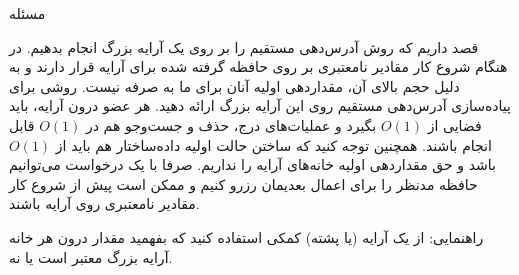 ‌مسئله


قصد داریم که روش آدرس‌دهی مستقیم را بر روی یک آرایه بزرگ انجام بدهیم. در هنگام شروع کار مقادیر نامعتبری بر روی حافظه گرفته شده برای آرایه قرار دارند و به دلیل حجم بالای آن، مقداردهی اولیه آنان برای ما به صرفه نیست. روشی برای پیاده‌سازی آدرس‌دهی مستقیم روی این آرایه بزرگ ارائه دهید. هر عضو درون آرایه، باید فضایی از $O(1)$ بگیرد و عملیات‌های درج، حذف و جست‌وجو هم در $O(1)$ قابل انجام باشند. همچنین توجه کنید که ساختن حالت اولیه داده‌ساختار هم باید از $O(1)$ باشد و حق مقداردهی اولیه خانه‌های آرایه را نداریم. صرفا با یک درخواست می‌توانیم حافظه مدنظر را برای اعمال بعدیمان رزرو کنیم و ممکن است پیش از شروع کار مقادیر نامعتبری روی آرایه باشند.

راهنمایی: از یک آرایه (یا پشته) کمکی استفاده کنید که بفهمید مقدار درون هر خانه آرایه بزرگ معتبر است یا نه.

